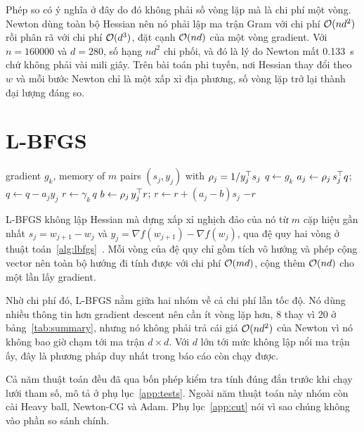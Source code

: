 Phép so có ý nghĩa ở đây do đó không phải số vòng lặp mà là chi phí một vòng.
Newton dùng toàn bộ Hessian nên nó phải lập ma trận Gram với chi phí $\mathcal{O}(nd^2)$
rồi phân rã với chi phí $\mathcal{O}(d^3)$, đặt cạnh $\mathcal{O}(nd)$ của một vòng gradient.
Với $n = \num{160000}$ và $d = 280$, số hạng $nd^2$ chi phối, và đó là lý do
Newton mất \SI{0.133}{\second} chứ không phải vài mili giây. Trên bài toán phi
tuyến, nơi Hessian thay đổi theo $w$ và mỗi bước Newton chỉ là một xấp xỉ địa
phương, số vòng lặp trở lại thành đại lượng đáng so.

\section{L-BFGS}
\label{sec:impl-lbfgs}

\begin{algorithm}[tp]
  \caption{Two-loop recursion for the L-BFGS direction}
  \label{alg:lbfgs}
  \begin{algorithmic}[1]
    \Require gradient $g_k$, memory of $m$ pairs $(s_j, y_j)$ with
             $\rho_j = 1 / y_j^{\top} s_j$
    \State $q \gets g_k$
      \State $a_j \gets \rho_j \, s_j^{\top} q$; \quad $q \gets q - a_j y_j$
    \EndFor
    \State $r \gets \gamma_k \, q$
      \State $b \gets \rho_j \, y_j^{\top} r$; \quad $r \gets r + (a_j - b) s_j$
    \EndFor
    \State \Return $-r$
  \end{algorithmic}
\end{algorithm}

L-BFGS không lập Hessian mà dựng xấp xỉ nghịch đảo của nó từ $m$ cặp hiệu gần
nhất $s_j = w_{j+1} - w_j$ và $y_j = \nabla f(w_{j+1}) - \nabla f(w_j)$, qua đệ
quy hai vòng ở thuật toán~\ref{alg:lbfgs}~\cite{nocedal2006numerical}. Mỗi vòng
của đệ quy chỉ gồm tích vô hướng và phép cộng vector nên toàn bộ hướng đi tính
được với chi phí $\mathcal{O}(md)$, cộng thêm $\mathcal{O}(nd)$ cho một lần lấy gradient.

Nhờ chi phí đó, L-BFGS nằm giữa hai nhóm về cả chi phí lẫn tốc độ. Nó dùng nhiều
thông tin hơn gradient descent nên cần ít vòng lặp hơn, 8 thay vì 20 ở
bảng~\ref{tab:summary}, nhưng nó không phải trả cái giá $\mathcal{O}(nd^2)$ của Newton
vì nó không bao giờ chạm tới ma trận $d \times d$. Với $d$ lớn tới mức không lập
nổi ma trận ấy, đây là phương pháp duy nhất trong báo cáo còn chạy được.

Cả năm thuật toán đều đã qua bốn phép kiểm tra tính đúng đắn trước khi chạy lưới
tham số, mô tả ở phụ lục~\ref{app:tests}. Ngoài năm thuật toán này nhóm còn cài
Heavy ball, Newton-CG và Adam. Phụ lục~\ref{app:cut} nói vì sao chúng không vào
phần so sánh chính.
